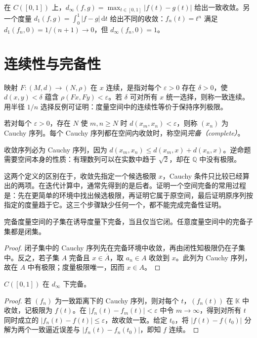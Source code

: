 \begin{example}
在 $C([0,1])$ 上，$d_\infty(f,g)=\max_{t\in[0,1]}|f(t)-g(t)|$ 给出一致收敛。另一个度量 $d_1(f,g)=\int_0^1|f-g|\,\mathrm dt$ 给出不同的收敛：$f_n(t)=t^n$ 满足 $d_1(f_n,0)=1/(n+1)\to0$，但 $d_\infty(f_n,0)=1$。
\end{example}

\section{连续性与完备性}
映射 $F:(M,d)\to(N,\rho)$ 在 $x$ 连续，是指对每个 $\varepsilon>0$ 存在 $\delta>0$，使 $d(x,y)<\delta$ 蕴含 $\rho(Fx,Fy)<\varepsilon$。若 $\delta$ 可对所有 $x$ 统一选择，则称一致连续。用半径 $1/n$ 选择反例可证明：度量空间中的连续性等价于保持序列极限。

\begin{definition}
若对每个 $\varepsilon>0$，存在 $N$ 使 $m,n\geq N$ 时 $d(x_m,x_n)<\varepsilon$，则称 $(x_n)$ 为 Cauchy 序列。每个 Cauchy 序列都在空间内收敛时，称空间\emph{完备（complete）}。
\end{definition}
收敛序列必为 Cauchy 序列，因为 $d(x_m,x_n)\leq d(x_m,x)+d(x_n,x)$。逆命题需要空间本身的性质：有理数列可以在实数中趋于 $\sqrt2$，却在 $\mathbb Q$ 中没有极限。

这两个定义的区别在于，收敛先指定一个候选极限 $x$，Cauchy 条件只比较已经算出的两项。在迭代计算中，通常先得到的是后者。证明一个空间完备的常用过程是：先在更简单的环境中找出候选极限，再证明它属于原空间，最后证明原序列按指定的度量趋于它。这三个步骤缺少任何一个，都不能完成完备性证明。

\begin{proposition}\label{prop:fa-closed-complete}
完备度量空间的子集在诱导度量下完备，当且仅当它闭。任意度量空间中的完备子集都是闭集。
\end{proposition}
\begin{proof}
闭子集中的 Cauchy 序列先在完备环境中收敛，再由闭性知极限仍在子集中。反之，若子集 $A$ 完备且 $x\in\overline A$，取 $a_n\in A$ 收敛到 $x$。此列为 Cauchy 序列，故在 $A$ 中有极限；度量极限唯一，因而 $x\in A$。
\end{proof}

\begin{example}[一致极限与完备性]
$C([0,1])$ 在 $d_\infty$ 下完备。
\end{example}
\begin{proof}
若 $(f_n)$ 为一致距离下的 Cauchy 序列，则对每个 $t$，$(f_n(t))$ 在 $\mathbb K$ 中收敛，记极限为 $f(t)$。在 $|f_n(t)-f_m(t)|<\varepsilon$ 中令 $m\to\infty$，得到对所有 $t$ 同时成立的 $|f_n(t)-f(t)|\leq\varepsilon$，故收敛一致。给定 $t_0$，将 $|f(t)-f(t_0)|$ 分解为两个一致逼近误差与 $|f_n(t)-f_n(t_0)|$，即知 $f$ 连续。
\end{proof}

